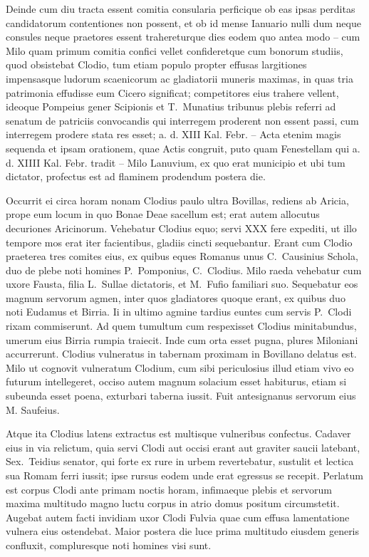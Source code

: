 Deinde cum diu tracta essent comitia consularia perficique ob eas ipsas perditas candidatorum contentiones non possent, et ob id mense Ianuario nulli dum neque consules neque praetores essent trahereturque dies eodem quo antea modo – cum Milo quam primum comitia confici vellet confideretque cum bonorum studiis, quod obsistebat Clodio, tum etiam populo propter effusas largitiones impensasque ludorum scaenicorum ac gladiatorii muneris maximas, in quas tria patrimonia effudisse eum Cicero significat; competitores eius trahere vellent, ideoque Pompeius gener Scipionis et T.~Munatius tribunus plebis referri ad senatum de patriciis convocandis qui interregem proderent non essent passi, cum interregem prodere stata res esset; a. d. XIII Kal. Febr. – Acta etenim magis sequenda et ipsam orationem, quae Actis congruit, puto quam Fenestellam qui a. d. XIIII Kal. Febr. tradit – Milo Lanuvium, ex quo erat municipio et ubi tum dictator, profectus est ad flaminem prodendum postera die. 

Occurrit ei circa horam nonam Clodius paulo ultra Bovillas, rediens ab Aricia, prope eum locum in quo Bonae Deae sacellum est; erat autem allocutus decuriones Aricinorum. Vehebatur Clodius equo; servi XXX fere expediti, ut illo tempore mos erat iter facientibus, gladiis cincti sequebantur. Erant cum Clodio praeterea tres comites eius, ex quibus eques Romanus unus C.~Causinius Schola, duo de plebe noti homines P.~Pomponius, C.~Clodius. Milo raeda vehebatur cum uxore Fausta, filia L.~Sullae dictatoris, et M.~Fufio familiari suo. Sequebatur eos magnum servorum agmen, inter quos gladiatores quoque erant, ex quibus duo noti Eudamus et Birria. Ii in ultimo agmine tardius euntes cum servis P.~Clodi rixam commiserunt. Ad quem tumultum cum respexisset Clodius minitabundus, umerum eius Birria rumpia traiecit. Inde cum orta esset pugna, plures Miloniani accurrerunt. Clodius vulneratus in tabernam proximam in Bovillano delatus est. Milo ut cognovit vulneratum Clodium, cum sibi periculosius illud etiam vivo eo futurum intellegeret, occiso autem magnum solacium esset habiturus, etiam si subeunda esset poena, exturbari taberna iussit. Fuit antesignanus servorum eius M. Saufeius. 

Atque ita Clodius latens extractus est multisque vulneribus confectus. Cadaver eius in via relictum, quia servi Clodi aut occisi erant aut graviter saucii latebant, Sex.~Teidius senator, qui forte ex rure in urbem revertebatur, sustulit et lectica sua Romam ferri iussit; ipse rursus eodem unde erat egressus se recepit. Perlatum est corpus Clodi ante primam noctis horam, infimaeque plebis et servorum maxima multitudo magno luctu corpus in atrio domus positum circumstetit. Augebat autem facti invidiam uxor Clodi Fulvia quae cum effusa lamentatione vulnera eius ostendebat. Maior postera die luce prima multitudo eiusdem generis confluxit, compluresque noti homines visi sunt. 

